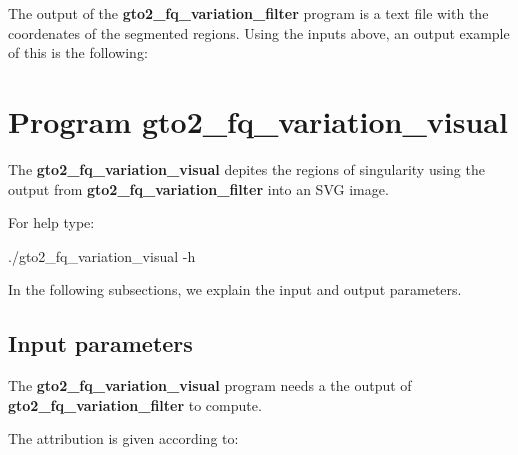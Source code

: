 \documentclass[11pt,]{krantz}
\newenvironment{Shaded}{\begin{snugshade}}{\end{snugshade}}
\newcommand{\CommentTok}[1]{\textcolor[rgb]{0.37,0.37,0.37}{\textit{#1}}}
\newcommand{\ExtensionTok}[1]{#1}
\newcommand{\NormalTok}[1]{#1}
\begin{document}
The output of the \textbf{gto2\_fq\_variation\_filter} program is a text
file with the coordenates of the segmented regions. Using the inputs
above, an output example of this is the following:

\begin{Shaded}
\end{Shaded}

\section{Program
gto2\_fq\_variation\_visual}\label{program-gto2_fq_variation_visual}

The \textbf{gto2\_fq\_variation\_visual} depites the regions of
singularity using the output from \textbf{gto2\_fq\_variation\_filter}
into an SVG image.

For help type:

\begin{Shaded}
\begin{Highlighting}[]
\ExtensionTok{./gto2_fq_variation_visual}\NormalTok{ -h}
\end{Highlighting}
\end{Shaded}

In the following subsections, we explain the input and output
parameters.

\subsection*{Input parameters}\label{input-parameters-25}


The \textbf{gto2\_fq\_variation\_visual} program needs a the output of
\textbf{gto2\_fq\_variation\_filter} to compute.

The attribution is given according to:
\end{document}
